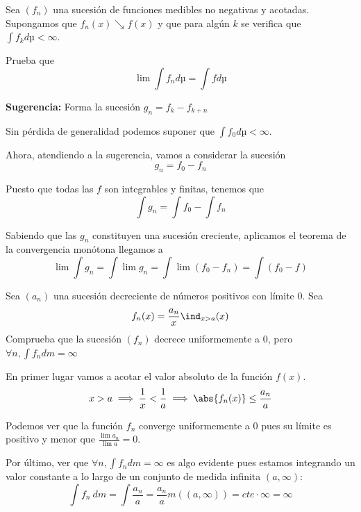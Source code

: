 \begin{problem}[9]

Sea $(f_n)$ una sucesión de funciones medibles no negativas y acotadas. Supongamos que $f_n(x) \searrow f(x)$ y que para algún $k$ se verifica que $\int f_k dµ < \infty$.

Prueba que
\[\lim \int f_n dµ = \int f dµ\]

\textbf{Sugerencia:} Forma la sucesión $g_n = f_k -f_{k+n}$

\solution

Sin pérdida de generalidad podemos suponer que $\int f_0 dµ < \infty$.

Ahora, atendiendo a la sugerencia, vamos a considerar la sucesión
\[g_n = f_0 - f_n\]

Puesto que todas las $f$ son integrables y finitas, tenemos que
\[\int g_n = \int f_0 - \int f_n\]

Sabiendo que las $g_n$ constituyen una sucesión creciente, aplicamos el teorema de la convergencia monótona llegamos a
\[\lim \int g_n = \int \lim g_n = \int \lim(f_0-f_n) = \int (f_0-f)\]
\end{problem}

\begin{problem}[10]
Sea $(a_n)$ una sucesión decreciente de números positivos con límite 0. Sea
\[f_n(x) = \frac{a_n}{x} \ind_{x > a}(x)\]
Comprueba que la sucesión $(f_n)$ decrece uniformemente a 0, pero $\forall n, \int f_n dm = \infty$

\solution

En primer lugar vamos a acotar el valor absoluto de la función $f(x)$.
\[x>a \implies \frac{1}{x} < \frac{1}{a} \implies \abs{f_n(x)} \leq \frac{a_n}{a}\]

Podemos ver que la función $f_n$ converge uniformemente a 0 pues su límite es positivo y menor que $\frac{\lim a_n}{\lim a} = 0$.

Por último, ver que $\forall n, \int f_n dm = \infty$ es algo evidente pues estamos integrando un valor constante a lo largo de un conjunto de medida infinita $(a, \infty)$:
\[\int f_n \ dm = \int \frac{a_n}{a} = \frac{a_n}{a} m((a, \infty)) = cte \cdot \infty = \infty\]

\end{problem}


